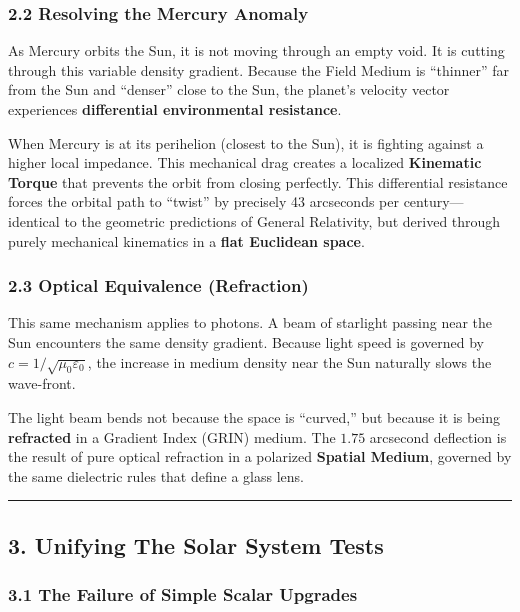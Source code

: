 \documentclass[
]{article}
\begin{document}
\subsubsection{2.2 Resolving the Mercury
Anomaly}\label{resolving-the-mercury-anomaly}

As Mercury orbits the Sun, it is not moving through an empty void. It is
cutting through this variable density gradient. Because the Field Medium
is ``thinner'' far from the Sun and ``denser'' close to the Sun, the
planet's velocity vector experiences \textbf{differential environmental
resistance}.

When Mercury is at its perihelion (closest to the Sun), it is fighting
against a higher local impedance. This mechanical drag creates a
localized \textbf{Kinematic Torque} that prevents the orbit from closing
perfectly. This differential resistance forces the orbital path to
``twist'' by precisely 43 arcseconds per century---identical to the
geometric predictions of General Relativity, but derived through purely
mechanical kinematics in a \textbf{flat Euclidean space}.

\subsubsection{2.3 Optical Equivalence
(Refraction)}\label{optical-equivalence-refraction}

This same mechanism applies to photons. A beam of starlight passing near
the Sun encounters the same density gradient. Because light speed is
governed by \(c = 1/\sqrt{\mu_0 \varepsilon_0}\), the increase in medium
density near the Sun naturally slows the wave-front.

The light beam bends not because the space is ``curved,'' but because it
is being \textbf{refracted} in a Gradient Index (GRIN) medium. The
\(1.75\) arcsecond deflection is the result of pure optical refraction
in a polarized \textbf{Spatial Medium}, governed by the same dielectric
rules that define a glass lens.

\begin{center}\rule{0.5\linewidth}{0.5pt}\end{center}

\subsection{3. Unifying The Solar System
Tests}\label{unifying-the-solar-system-tests}

\subsubsection{3.1 The Failure of Simple Scalar
Upgrades}\label{the-failure-of-simple-scalar-upgrades}
\end{document}
